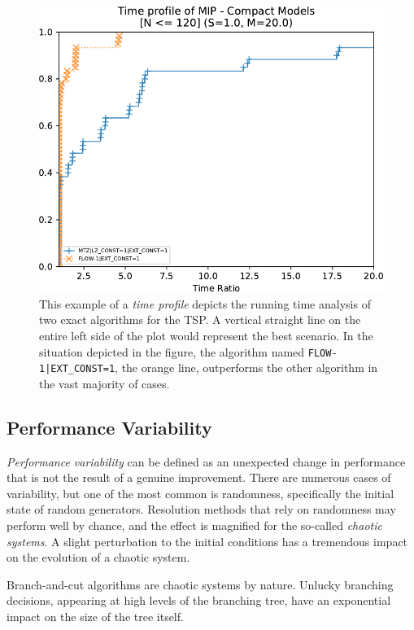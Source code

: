 \begin{figure}[t]
	\centering
	\includegraphics[width=\textwidth]{./Imgs/perfprof-tsp-example/time-ratio20.0.cropped.pdf}
	\caption{
		This example of a \textit{time profile} depicts the running time analysis of two exact algorithms for the TSP.
		A vertical straight line on the entire left side of the plot would represent the best scenario.
		In the situation depicted in the figure, the algorithm named \texttt{FLOW-1|EXT\_CONST=1}, the orange line, outperforms the other algorithm in the vast majority of cases.
	}
	\label{fig:example-of-time-profile-tsp}
\end{figure}

\subsection{Performance Variability}
\label{sec:performance-variability}

\textit{Performance variability} \parencite{lodi2013performance} can be defined as an unexpected change in performance that is not the result of a genuine improvement.
There are numerous cases of variability, but one of the most common is randomness, specifically the initial state of random generators.
Resolution methods that rely on randomness may perform well by chance, and the effect is magnified for the so-called \textit{chaotic systems}.
A slight perturbation to the initial conditions has a tremendous impact on the evolution of a chaotic system.

Branch-and-cut algorithms are chaotic systems by nature.
Unlucky branching decisions, appearing at high levels of the branching tree, have an exponential impact on the size of the tree itself.


